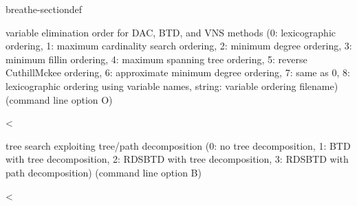 \documentclass[letterpaper,10pt,openany,oneside,english]{sphinxmanual}
\begin{document}
\begin{fulllineitems}
\begin{sphinxuseclass}{breathe-sectiondef}
\begin{fulllineitems}
\sphinxAtStartPar
variable elimination order for DAC, BTD, and VNS methods (0: lexicographic ordering, \sphinxhyphen{}1: maximum cardinality search ordering, \sphinxhyphen{}2: minimum degree ordering, \sphinxhyphen{}3: minimum fill\sphinxhyphen{}in ordering, \sphinxhyphen{}4: maximum spanning tree ordering, \sphinxhyphen{}5: reverse Cuthill\sphinxhyphen{}Mckee ordering, \sphinxhyphen{}6: approximate minimum degree ordering, \sphinxhyphen{}7: same as 0, 8: lexicographic ordering using variable names, string: variable ordering filename) (command line option \sphinxhyphen{}O) 

\end{fulllineitems}


\begin{fulllineitems}
\label{\detokenize{ref/ref_cpp:_CPPv4N8ToulBar210btdSubTreeE}}\label{\detokenize{ref/ref_cpp:_CPPv3N8ToulBar210btdSubTreeE}}\label{\detokenize{ref/ref_cpp:_CPPv2N8ToulBar210btdSubTreeE}}\label{\detokenize{ref/ref_cpp:ToulBar2::btdSubTree__i}}
\pysigstartsignatures
\pysigstartmultiline
{}
\pysigstopmultiline
\pysigstopsignatures
\sphinxAtStartPar
\textless{} 

\sphinxAtStartPar
tree search exploiting tree/path decomposition (0: no tree decomposition, 1: BTD with tree decomposition, 2: RDS\sphinxhyphen{}BTD with tree decomposition, 3: RDS\sphinxhyphen{}BTD with path decomposition) (command line option \sphinxhyphen{}B) 

\end{fulllineitems}


\begin{fulllineitems}
\label{\detokenize{ref/ref_cpp:_CPPv4N8ToulBar214btdRootClusterE}}\label{\detokenize{ref/ref_cpp:_CPPv3N8ToulBar214btdRootClusterE}}\label{\detokenize{ref/ref_cpp:_CPPv2N8ToulBar214btdRootClusterE}}\label{\detokenize{ref/ref_cpp:ToulBar2::btdRootCluster__i}}
\pysigstartsignatures
\pysigstartmultiline
{}
\pysigstopmultiline
\pysigstopsignatures
\sphinxAtStartPar
\textless{} 


\end{fulllineitems}
\end{sphinxuseclass}
\end{fulllineitems}
\end{document}
